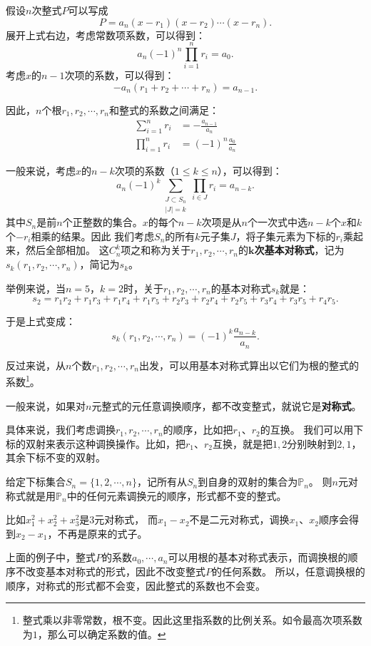 \documentclass[12pt,UTF8]{ctexbook}
\theoremstyle{definition}
\theoremstyle{plain}
\begin{document}
假设$n$次整式$P$可以写成
$$ P = a_n (x - r_1)(x - r_2)\cdots (x - r_n).$$
展开上式右边，考虑常数项系数，可以得到：
$$ a_n (-1)^n \prod_{i=1}^n r_i = a_0.$$
考虑$x$的$n-1$次项的系数，可以得到：
$$ - a_n (r_1 + r_2 + \cdots + r_n) = a_{n-1}. $$

因此，$n$个根$r_1, r_2, \cdots , r_n$和整式的系数之间满足：
\begin{align*}
    \sum_{i=1}^n r_i &= -\frac{a_{n-1}}{a_n} \\
    \prod_{i=1}^n r_i &= (-1)^n \frac{a_0}{a_n}
\end{align*}

一般来说，考虑$x$的$n-k$次项的系数（$1\leqslant k \leqslant n$），可以得到：
$$ a_n (-1)^k \sum_{\substack{J\subset S_n\\|J|=k}} \prod_{i\in J}r_{i} = a_{n-k}. $$
其中$S_n$是前$n$个正整数的集合。$x$的每个$n-k$次项是从$n$个一次式中选$n-k$个$x$和$k$个$-r_i$相乘的结果。因此
我们考虑$S_n$的所有$k$元子集$J$，将子集元素为下标的$r_i$乘起来，然后全部相加。
这$C_n^k$项之和称为关于$r_1, r_2, \cdots , r_n$的$\boldsymbol{k}$\textbf{次基本对称式}，记为$s_{k}(r_1, r_2, \cdots , r_n)$，简记为$s_k$。

举例来说，当$n=5$，$k=2$时，关于$r_1, r_2, \cdots , r_n$的基本对称式$s_{k}$就是：
$$ s_{2} = r_1r_2 + r_1r_3 + r_1r_4 + r_1r_5 + r_2r_3 + r_2r_4 + r_2r_5 + r_3r_4 + r_3r_5 + r_4r_5.$$

于是上式变成：
$$ s_{k}(r_1, r_2, \cdots , r_n) = (-1)^k \frac{a_{n-k}}{a_n}. $$

反过来说，从$n$个数$r_1, r_2, \cdots , r_n$出发，可以用基本对称式算出以它们为根的整式的系数\footnote{整式乘以非零常数，根不变。因此这里指系数的比例关系。如令最高次项系数为$1$，那么可以确定系数的值。}。

一般来说，如果对$n$元整式的元任意调换顺序，都不改变整式，就说它是\textbf{对称式}。

具体来说，我们考虑调换$r_1, r_2, \cdots , r_n$的顺序，比如把$r_1$、$r_2$的互换。
我们可以用下标的双射来表示这种调换操作。比如，把$r_1$、$r_2$互换，就是把$1,2$分别映射到$2,1$，其余下标不变的双射。

给定下标集合$S_n = \{1, 2, \cdots , n\}$，记所有从$S_n$到自身的双射的集合为$\mathbb{P}_n$。
则$n$元对称式就是用$\mathbb{P}_n$中的任何元素调换元的顺序，形式都不变的整式。

比如$x_1^2 + x_2^2 + x_3^2$是$3$元对称式，
而$x_1 - x_2$不是二元对称式，调换$x_1$、$x_2$顺序会得到$x_2 - x_1$，不再是原来的式子。

上面的例子中，整式$P$的系数$a_0, \cdots, a_n$可以用根的基本对称式表示，而调换根的顺序不改变基本对称式的形式，因此不改变整式$P$的任何系数。
所以，任意调换根的顺序，对称式的形式都不会变，因此整式的系数也不会变。
\end{document}
